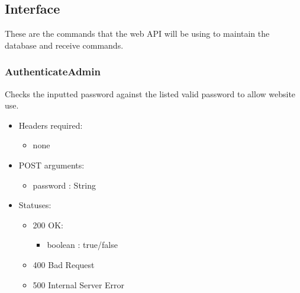\subsection{Interface}
    These are the commands that the web API will be using to maintain the database and receive commands.

    \subsubsection{AuthenticateAdmin}
        Checks the inputted password against the listed valid password to allow website use.
        \begin{itemize}
            \item Headers required:
            \begin{itemize}
                 \item none
             \end{itemize}
            \item POST arguments:
            \begin{itemize}
                 \item password : String
             \end{itemize}
             \item Statuses:
            \begin{itemize}
                \item 200 OK:
                \begin{itemize}
                    \item boolean : true/false
                \end{itemize}
                \item 400 Bad Request
                \item 500 Internal Server Error
            \end{itemize}
       \end{itemize}

